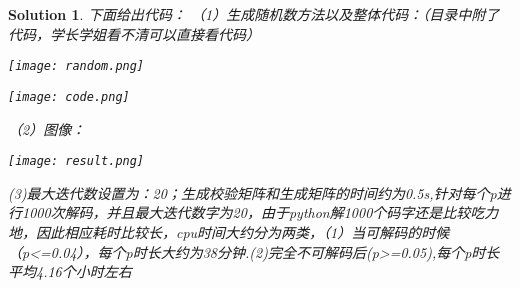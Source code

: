 \documentclass[UTF8,oneside]{article}
\newtheorem*{Solution}{Solution}
\begin{document}
\begin{Solution}
下面给出代码：
（1）生成随机数方法以及整体代码：（目录中附了代码，学长学姐看不清可以直接看代码）
\begin{center}
\texttt{[image: random.png]}
\end{center}
\begin{center}
\texttt{[image: code.png]}
\end{center}
（2）图像：
\begin{center}
\texttt{[image: result.png]}
\end{center}
(3)最大迭代数设置为：20；生成校验矩阵和生成矩阵的时间约为0.5s,针对每个p进行1000次解码，并且最大迭代数字为20，由于python解1000个码字还是比较吃力地，因此相应耗时比较长，cpu时间大约分为两类，（1）当可解码的时候（p<=0.04），每个p时长大约为38分钟.(2)完全不可解码后(p>=0.05),每个p时长平均4.16个小时左右
	
\end{Solution}
\end{document}
